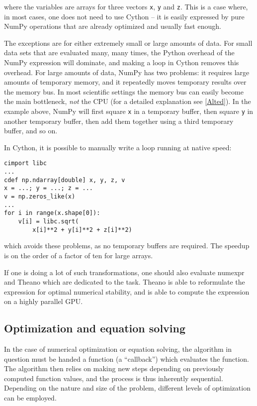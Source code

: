 \documentclass[letterpaper,11pt,english]{article}
\newcommand{\code}[1]{\texttt{#1}}
\def\emph#1{{\sl #1}}
\begin{document}
where the variables are arrays for three vectors \code{x}, \code{y} and
\code{z}. This is a case where, in most cases, one does not need to use
Cython -- it is easily expressed by pure NumPy operations that are
already optimized and usually fast enough.

The exceptions are for either extremely small or large amounts of
data. For small data sets that are evaluated many, many times, the
Python overhead of the NumPy expression will dominate, and making a
loop in Cython removes this overhead. For large amounts of data, NumPy
has two problems: it requires large amounts of temporary memory, and
it repeatedly moves temporary results over the memory bus.  In most
scientific settings the memory bus can easily become the main
bottleneck, \emph{not} the CPU (for a detailed explanation see
\hyperlink{alted}{{[}Alted{]}}). In the example above, NumPy will first square \code{x} in
a temporary buffer, then square \code{y} in another temporary buffer,
then add them together using a third temporary buffer, and so on.

In Cython, it is possible to manually write a loop running at native
speed:

\begin{verbatim}
cimport libc
...
cdef np.ndarray[double] x, y, z, v
x = ...; y = ...; z = ...
v = np.zeros_like(x)
...
for i in range(x.shape[0]):
    v[i] = libc.sqrt(
        x[i]**2 + y[i]**2 + z[i]**2)
\end{verbatim}

which avoids these problems, as no temporary buffers are required.
The speedup is on the order of a factor of ten for large arrays.

If one is doing a lot of such transformations, one should also
evaluate numexpr and Theano
which are dedicated to the
task. Theano is able to reformulate the expression for optimal numerical
stability, and is able to compute the expression on a
highly parallel GPU.


\subsection{Optimization and equation solving}

In the case of numerical optimization or equation solving, the
algorithm in question must be handed a function (a ``callback'') which
evaluates the function. The algorithm then relies on making new steps
depending on previously computed function values, and the process is
thus inherently sequential.  Depending on the nature and size of the
problem, different levels of optimization can be employed.
\end{document}
